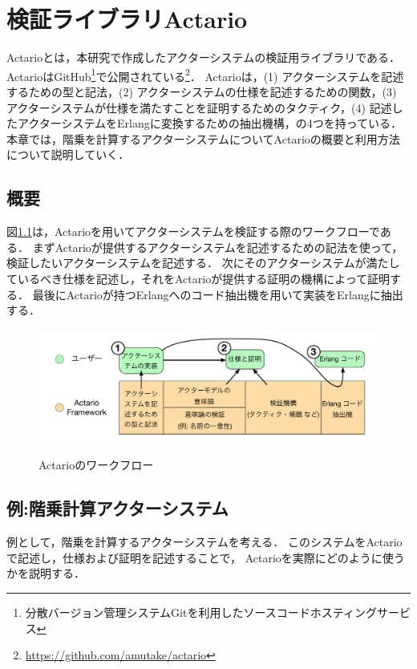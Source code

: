 \chapter{検証ライブラリActario}
\label{chapter:overview}

Actario\cite{Yasutake:2015aa}とは，本研究で作成したアクターシステムの検証用ライブラリである．
ActarioはGitHub\footnote{分散バージョン管理システムGitを利用したソースコードホスティングサービス}で公開されている\footnote{\url{https://github.com/amutake/actario}}．
Actarioは，(1) アクターシステムを記述するための型と記法，(2) アクターシステムの仕様を記述するための関数，(3) アクターシステムが仕様を満たすことを証明するためのタクティク，(4) 記述したアクターシステムをErlangに変換するための抽出機構，の4つを持っている．
本章では，階乗を計算するアクターシステムについてActarioの概要と利用方法について説明していく．

\section{概要}

図\ref{img:overview:workflow}は，Actarioを用いてアクターシステムを検証する際のワークフローである．
まずActarioが提供するアクターシステムを記述するための記法を使って，検証したいアクターシステムを記述する．
次にそのアクターシステムが満たしているべき仕様を記述し，それをActarioが提供する証明の機構によって証明する．
最後にActarioが持つErlangへのコード抽出機を用いて実装をErlangに抽出する．

\begin{figure}[tp]
  \centering
  \includegraphics[width=15cm]{./img/overview/workflow.pdf}
  \label{img:overview:workflow}
  \caption{Actarioのワークフロー}
\end{figure}

\section{例:階乗計算アクターシステム}

例として，階乗を計算するアクターシステムを考える．
このシステムをActarioで記述し，仕様および証明を記述することで，
Actarioを実際にどのように使うかを説明する．

